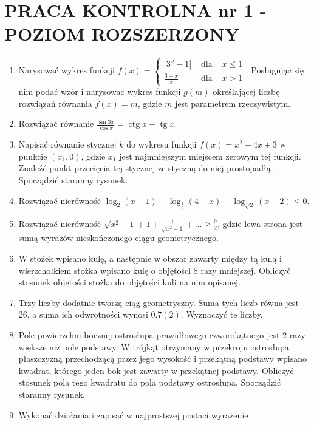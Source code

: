 \documentclass[10pt]{article}
\begin{document}
\section*{PRACA KONTROLNA nr 1 - POZIOM ROZSZERZONY}
\begin{enumerate}
  \item Narysować wykres funkcji $f(x)=\left\{\begin{array}{lll}\left|3^{x}-1\right| & \text { dla } & x \leqslant 1 \\ \frac{3-x}{x} & \text { dla } & x>1\end{array}\right.$. Posługując się nim podać wzór i narysować wykres funkcji $g(m)$ określającej liczbę rozwiązań równania $f(x)=m$, gdzie $m$ jest parametrem rzeczywistym.
  \item Rozwiązać równanie $\frac{\sin 3 x}{\cos x}=\operatorname{ctg} x-\operatorname{tg} x$.
  \item Napisać równanie stycznej $k$ do wykresu funkcji $f(x)=x^{2}-4 x+3$ w punkcie $\left(x_{1}, 0\right)$, gdzie $x_{1}$ jest najmniejszym miejscem zerowym tej funkcji. Znaleźć punkt przecięcia tej stycznej ze styczną do niej prostopadłą . Sporządzić staranny rysunek.
  \item Rozwiązać nierówność $\log _{2}(x-1)-\log _{\frac{1}{2}}(4-x)-\log _{\sqrt{2}}(x-2) \leqslant 0$.
  \item Rozwiązać nierówność $\sqrt{x^{2}-1}+1+\frac{1}{\sqrt{x^{2}-1}}+\ldots \geqslant \frac{9}{2}$, gdzie lewa strona jest sumą wyrazów nieskończonego ciągu geometrycznego.
  \item W stożek wpisano kulę, a następnie w obszar zawarty między tą kulą i wierzchołkiem stożka wpisano kulę o objętości 8 razy mniejszej. Obliczyć stosunek objętości stożka do objętości kuli na nim opisanej.
  \item Trzy liczby dodatnie tworzą ciąg geometryczny. Suma tych liczb równa jest 26, a suma ich odwrotności wynosi $0.7(2)$. Wyznaczyć te liczby.
  \item Pole powierzchni bocznej ostrosłupa prawidłowego czworokątnego jest 2 razy większe niż pole podstawy. W trójkąt otrzymany w przekroju ostrosłupa płaszczyzną przechodzącą przez jego wysokość i przekątną podstawy wpisano kwadrat, którego jeden bok jest zawarty w przekątnej podstawy. Obliczyć stosunek pola tego kwadratu do pola podstawy ostrosłupa. Sporządzić staranny rysunek.
  \item Wykonać działania i zapisać w najprostszej postaci wyrażenie
\end{enumerate}
\end{document}

